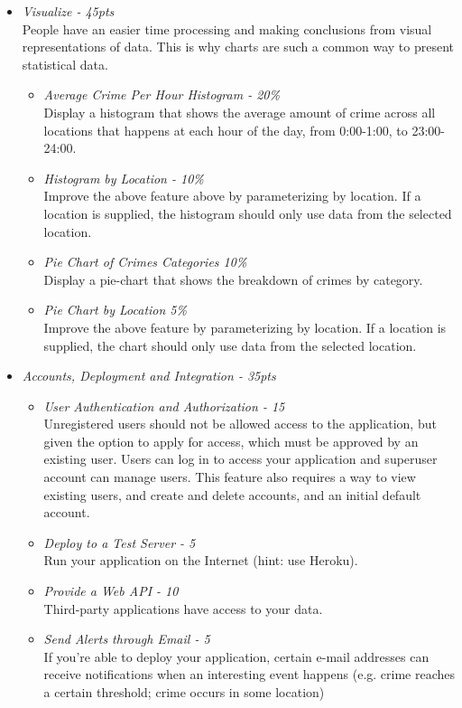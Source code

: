 \documentclass[12pt]{article}
\begin{document}
\begin{itemize}
\item \textit{Visualize - 45pts} \\
People have an easier time processing and making conclusions from visual representations of data. This is why charts are such a common way to present statistical data.
\begin{itemize}
\item \textit{Average Crime Per Hour Histogram - 20\%} \\
Display a histogram that shows the average amount of crime across all locations that happens at each hour of the day, from 0:00-1:00, to 23:00-24:00.
\item \textit{Histogram by Location - 10\%} \\
Improve the above feature above by parameterizing by location. If a location is supplied, the histogram should only use data from the selected location.
\item \textit{Pie Chart of Crimes Categories 10\%} \\
Display a pie-chart that shows the breakdown of crimes by category.
\item \textit{Pie Chart by Location 5\%} \\
Improve the above feature by parameterizing by location. If a location is supplied, the chart should only use data from the selected location.
\end{itemize}

\item \textit{Accounts, Deployment and Integration - 35pts}
\begin{itemize}
\item \textit{User Authentication and Authorization - 15} \\
Unregistered users should not be allowed access to the application, but given the option to apply for access, which must be approved by an existing user. Users can log in to access your application and superuser account can manage users. This feature also requires a way to view existing users, and create and delete accounts, and an initial default account.
\item \textit{Deploy to a Test Server - 5} \\
Run your application on the Internet (hint: use Heroku).
\item \textit{Provide a Web API - 10} \\
Third-party applications have access to your data.
\item \textit{Send Alerts through Email - 5} \\
If you're able to deploy your application, certain e-mail addresses can receive notifications when an interesting event happens (e.g. crime reaches a certain threshold; crime occurs in some location)
\end{itemize}
\end{itemize}
\end{document}
